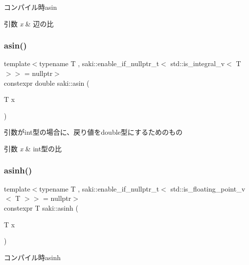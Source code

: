コンパイル時asin 


\begin{DoxyParams}{引数}
{\em x} & 辺の比 \\
\hline
\end{DoxyParams}
\mbox{\label{namespacesaki_aac285debedd1f53761a838c0e4f57af0}} 
\subsubsection{\texorpdfstring{asin()}{asin()}\hspace{0.1cm}{\footnotesize\ttfamily [2/2]}}
{\footnotesize\ttfamily template$<$typename T , saki\+::enable\+\_\+if\+\_\+nullptr\+\_\+t$<$ std\+::is\+\_\+integral\+\_\+v$<$ T $>$$>$  = nullptr$>$ \\
constexpr double saki\+::asin (\begin{DoxyParamCaption}\item[{T}]{x }\end{DoxyParamCaption})}



引数がint型の場合に、戻り値をdouble型にするためのもの 


\begin{DoxyParams}{引数}
{\em x} & int型の比 \\
\hline
\end{DoxyParams}
\mbox{\label{namespacesaki_ab097a2d600f313b6bdd3099e61a10b9e}} 
\subsubsection{\texorpdfstring{asinh()}{asinh()}\hspace{0.1cm}{\footnotesize\ttfamily [1/2]}}
{\footnotesize\ttfamily template$<$typename T , saki\+::enable\+\_\+if\+\_\+nullptr\+\_\+t$<$ std\+::is\+\_\+floating\+\_\+point\+\_\+v$<$ T $>$$>$  = nullptr$>$ \\
constexpr T saki\+::asinh (\begin{DoxyParamCaption}\item[{T}]{x }\end{DoxyParamCaption})}



コンパイル時asinh 

\mbox{\label{namespacesaki_aac840ca5d9b98ac0a8c5b15752f02072}} 
